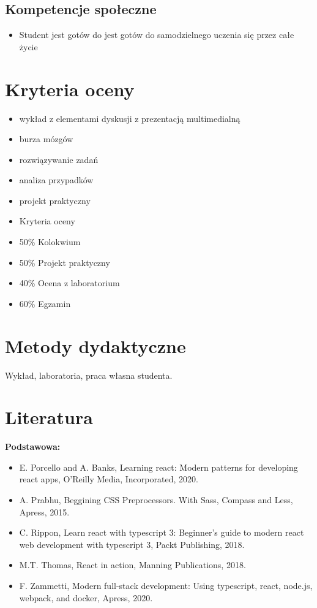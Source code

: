 \documentclass[12pt, a4paper]{article}
\begin{document}
\subsection*{Kompetencje społeczne}
\begin{itemize}
  \item Student jest gotów do jest gotów do samodzielnego uczenia się przez całe życie
\end{itemize}

\section{Kryteria oceny}

\begin{itemize}
  \item wykład z elementami dyskusji z prezentacją multimedialną
  \item burza mózgów
  \item rozwiązywanie zadań
  \item analiza przypadków
  \item projekt praktyczny
  \item Kryteria oceny
  \item 50\% Kolokwium
  \item 50\% Projekt praktyczny
  \item 40\% Ocena z laboratorium
  \item 60\% Egzamin
\end{itemize}

\section{Metody dydaktyczne}

Wykład, laboratoria, praca własna studenta.

\section{Literatura}

\textbf{Podstawowa:}
\begin{itemize}
  \item E. Porcello and A. Banks, Learning react: Modern patterns for developing react apps, O’Reilly Media, Incorporated, 2020.
  \item A. Prabhu, Beggining CSS Preprocessors. With Sass, Compass and Less, Apress, 2015.
  \item C. Rippon, Learn react with typescript 3: Beginner’s guide to modern react web development with typescript 3, Packt Publishing, 2018.
  \item M.T. Thomas, React in action, Manning Publications, 2018.
  \item F. Zammetti, Modern full-stack development: Using typescript, react, node.js, webpack, and docker, Apress, 2020.
\end{itemize}
\end{document}
